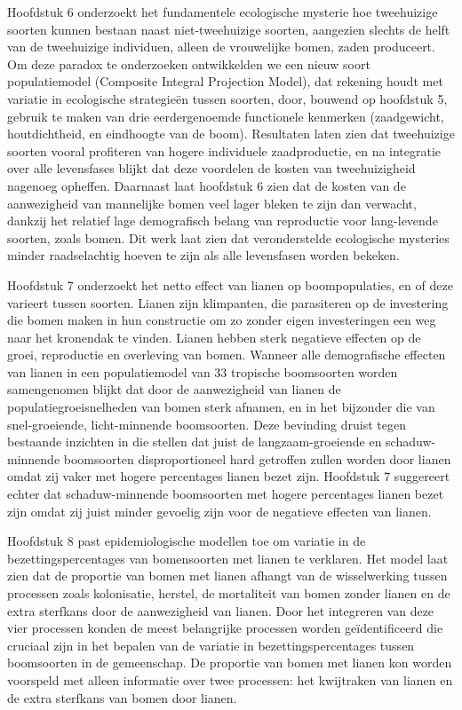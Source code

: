 \documentclass[b5paper,justified]{tufte-book} %
\begin{document}
\begin{fullwidth}
Hoofdstuk 6 onderzoekt het fundamentele ecologische mysterie hoe tweehuizige soorten kunnen bestaan naast niet-tweehuizige soorten, aangezien slechts de helft van de tweehuizige individuen, alleen de vrouwelijke bomen, zaden produceert. Om deze paradox te onderzoeken ontwikkelden we een nieuw soort populatiemodel (Composite Integral Projection Model), dat rekening houdt met variatie in ecologische strategie\"en tussen soorten, door, bouwend op 
hoofdstuk 5, gebruik te maken van drie eerdergenoemde functionele kenmerken (zaadgewicht, houtdichtheid, en eindhoogte van de boom). Resultaten laten zien dat tweehuizige soorten vooral profiteren van hogere individuele zaadproductie, en na integratie over alle levensfases blijkt dat deze voordelen de kosten van tweehuizigheid nagenoeg opheffen. Daarnaast laat hoofdstuk 6 zien dat de kosten van de aanwezigheid van mannelijke bomen veel lager bleken te zijn dan verwacht, dankzij het relatief lage demografisch belang van reproductie voor lang-levende soorten, zoals bomen. Dit werk laat zien dat veronderstelde ecologische mysteries minder raadselachtig hoeven te zijn als alle levensfasen worden bekeken. 

Hoofdstuk 7 onderzoekt het netto effect van lianen op boompopulaties, en of deze varieert tussen soorten. Lianen zijn klimpanten, die parasiteren op de investering die bomen maken in hun constructie om zo zonder eigen investeringen een weg naar het kronendak te vinden. Lianen hebben sterk negatieve effecten op de groei, reproductie en overleving van bomen. Wanneer alle demografische effecten van lianen in een populatiemodel van 33 tropische boomsoorten worden samengenomen blijkt dat door de aanwezigheid van lianen de populatiegroeisnelheden van bomen sterk afnamen, en in het bijzonder die van snel-groeiende, licht-minnende boomsoorten. Deze bevinding druist tegen bestaande inzichten in die stellen dat juist de langzaam-groeiende en schaduw-minnende boomsoorten disproportioneel hard getroffen zullen worden door lianen omdat zij vaker met hogere percentages lianen bezet zijn. Hoofdstuk 7 suggereert echter dat schaduw-minnende boomsoorten met hogere percentages lianen bezet zijn omdat zij juist minder gevoelig zijn voor de negatieve effecten van lianen.

Hoofdstuk 8 past epidemiologische modellen toe om variatie in de bezettingspercentages van bomensoorten met lianen te verklaren. Het model laat zien dat de proportie van bomen met lianen afhangt van de wisselwerking tussen processen zoals kolonisatie, herstel, de mortaliteit van bomen zonder lianen en de extra sterfkans door de aanwezigheid van lianen. Door het integreren van deze vier processen konden de meest belangrijke processen worden ge\"identificeerd die cruciaal zijn in het bepalen van de variatie in bezettingspercentages tussen boomsoorten in de gemeenschap. De proportie van bomen met lianen kon worden voorspeld met alleen informatie over twee processen: het kwijtraken van lianen en de extra sterfkans van bomen door lianen. 


\end{fullwidth}
\end{document}
